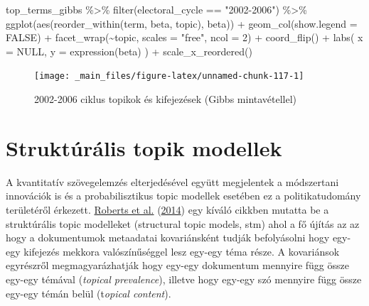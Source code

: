 \documentclass[
]{book}
\newenvironment{Shaded}{\begin{snugshade}}{\end{snugshade}}
\newcommand{\AttributeTok}[1]{\textcolor[rgb]{0.77,0.63,0.00}{#1}}
\newcommand{\ConstantTok}[1]{\textcolor[rgb]{0.00,0.00,0.00}{#1}}
\newcommand{\DecValTok}[1]{\textcolor[rgb]{0.00,0.00,0.81}{#1}}
\newcommand{\FunctionTok}[1]{\textcolor[rgb]{0.00,0.00,0.00}{#1}}
\newcommand{\NormalTok}[1]{#1}
\newcommand{\SpecialCharTok}[1]{\textcolor[rgb]{0.00,0.00,0.00}{#1}}
\newcommand{\StringTok}[1]{\textcolor[rgb]{0.31,0.60,0.02}{#1}}
\begin{document}
\begin{Shaded}
\begin{Highlighting}[]
\NormalTok{top\_terms\_gibbs }\SpecialCharTok{\%\textgreater{}\%}
  \FunctionTok{filter}\NormalTok{(electoral\_cycle }\SpecialCharTok{==} \StringTok{"2002{-}2006"}\NormalTok{) }\SpecialCharTok{\%\textgreater{}\%}
  \FunctionTok{ggplot}\NormalTok{(}\FunctionTok{aes}\NormalTok{(}\FunctionTok{reorder\_within}\NormalTok{(term, beta, topic), beta)) }\SpecialCharTok{+}
  \FunctionTok{geom\_col}\NormalTok{(}\AttributeTok{show.legend =} \ConstantTok{FALSE}\NormalTok{) }\SpecialCharTok{+}
  \FunctionTok{facet\_wrap}\NormalTok{(}\SpecialCharTok{\textasciitilde{}}\NormalTok{topic, }\AttributeTok{scales =} \StringTok{"free"}\NormalTok{, }\AttributeTok{ncol =} \DecValTok{2}\NormalTok{) }\SpecialCharTok{+}
  \FunctionTok{coord\_flip}\NormalTok{() }\SpecialCharTok{+}
  \FunctionTok{labs}\NormalTok{(}
    \AttributeTok{x =} \ConstantTok{NULL}\NormalTok{,}
    \AttributeTok{y =} \FunctionTok{expression}\NormalTok{(beta)}
\NormalTok{  ) }\SpecialCharTok{+}
  \FunctionTok{scale\_x\_reordered}\NormalTok{()}
\end{Highlighting}
\end{Shaded}

\begin{figure}

{\centering \texttt{[image: \_main\_files/figure-latex/unnamed-chunk-117-1]} 

}

\caption{2002-2006 ciklus topikok és kifejezések (Gibbs mintavétellel)}\label{fig:unnamed-chunk-117}
\end{figure}

\hypertarget{struktuxfaruxe1lis-topik-modellek}{%
\section{Struktúrális topik
modellek}\label{struktuxfaruxe1lis-topik-modellek}}

A kvantitatív szövegelemzés elterjedésével együtt megjelentek a
módszertani innovációk is és a probabilisztikus topic modellek esetében
ez a politikatudomány területéről érkezett.
\protect\hyperlink{ref-roberts2014structural}{Roberts et al.}
(\protect\hyperlink{ref-roberts2014structural}{2014}) egy kíváló cikkben
mutatta be a struktúrális topic modelleket (structural topic models,
stm) ahol a fő újítás az az hogy a dokumentumok metaadatai kovariánsként
tudják befolyásolni hogy egy-egy kifejezés mekkora valószínűséggel lesz
egy-egy téma része. A kovariánsok egyrészről megmagyarázhatják hogy
egy-egy dokumentum mennyire függ össze egy-egy témával (\emph{topical
prevalence}), illetve hogy egy-egy szó mennyire függ össze egy-egy témán
belül (t\emph{opical content}).
\end{document}

